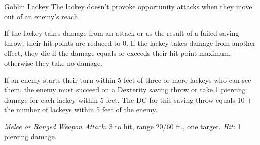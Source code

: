 \documentclass[10pt,a4paper,twoside,bg=print,twocolumn,openany,nodeprecatedcode]{dndbook}
\begin{document}
\begin{DndMonster}[float=t]{Goblin Lackey}
\DndMonsterBasics[
armor-class = {14 (\textit{leather armor})},
hit-points = {\DndDice{6}},
speed = {30 ft., climb 20 ft.}
]
\DndMonsterAbilityScores[
 str = 8,
 dex = 13,
 con = 10,
 int = 10,
 wis = 8,
 cha = 8
]
\DndMonsterDetails[
senses = {darkvision 60 ft., passive perception 9},
languages = {Common, Goblin},
challenge = 1/4,
]
The lackey doesn't provoke opportunity attacks when they move out of an enemy's reach.

If the lackey takes damage from an attack or as the result of a failed saving throw, their hit points are reduced to 0. If the lackey takes damage from another effect, they die if the damage equals or exceeds their hit point maximum; otherwise they take no damage.

If an enemy starts their turn within 5 feet of three or more lackeys who can see them, the enemy must succeed on a Dexterity saving throw or take 1 piercing damage for each lackey within 5 feet. The DC for this saving throw equals 10 + the number of lackeys within 5 feet of the enemy.

\textsl{Melee or Ranged Weapon Attack:} 3 to hit, range 20/60 ft., one target. \textsl{Hit:} 1 piercing damage.

\end{DndMonster}
\end{document}
